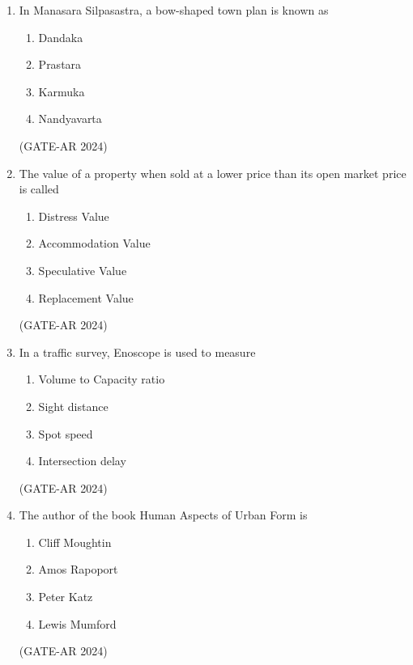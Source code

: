 \documentclass[a4paper,10pt]{article}
\begin{document}
\begin{enumerate}
    \item In Manasara Silpasastra, a bow-shaped town plan is known as
    \begin{multicols}{4}
    \begin{enumerate}
        \item Dandaka
        \item Prastara
        \item Karmuka
        \item Nandyavarta
    \end{enumerate}
    \end{multicols}
    \hfill (GATE-AR 2024)

    \item The value of a property when sold at a lower price than its open market price is called
    \begin{multicols}{2}
    \begin{enumerate}
        \item Distress Value
        \item Accommodation Value
        \item Speculative Value
        \item Replacement Value
    \end{enumerate}
    \end{multicols}
    \hfill (GATE-AR 2024)

    \item In a traffic survey, Enoscope is used to measure
    \begin{multicols}{4}
    \begin{enumerate}
        \item Volume to Capacity ratio
        \item Sight distance
        \item Spot speed
        \item Intersection delay
    \end{enumerate}
    \end{multicols}
    \hfill (GATE-AR 2024)

    \item The author of the book Human Aspects of Urban Form is
    \begin{multicols}{4}
    \begin{enumerate}
        \item Cliff Moughtin
        \item Amos Rapoport
        \item Peter Katz
        \item Lewis Mumford
    \end{enumerate}
    \end{multicols}
    \hfill (GATE-AR 2024)


\end{enumerate}
\end{document}
